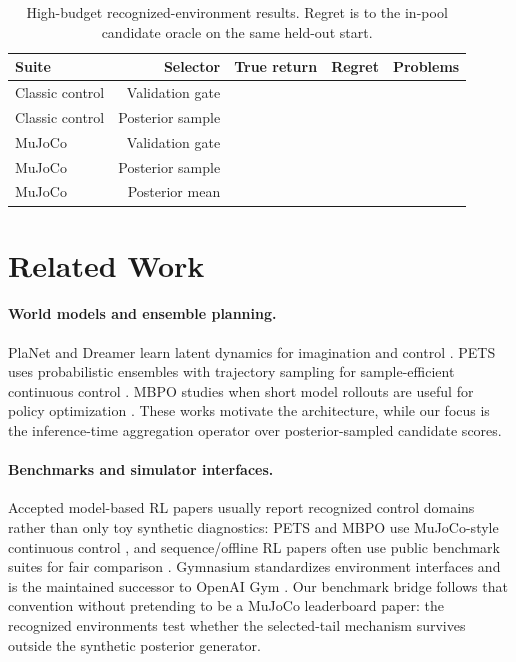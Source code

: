 \documentclass{article}
\begin{document}
\begin{table}[t]
\centering
\caption{High-budget recognized-environment results. Regret is to the in-pool
candidate oracle on the same held-out start.}
\label{tab:v4}
\begin{tabular}{lrrrr}
\toprule
Suite & Selector & True return & Regret & Problems \\
\midrule
Classic control & Validation gate & \VFourGymGateReturn{} & \VFourGymGateRegret{} & \VFourGymProblems{} \\
Classic control & Posterior sample & \VFourGymSampleReturn{} & \VFourGymSampleRegret{} & \VFourGymProblems{} \\
MuJoCo & Validation gate & \VFourMujocoGateReturn{} & \VFourMujocoGateRegret{} & \VFourMujocoProblems{} \\
MuJoCo & Posterior sample & \VFourMujocoSampleReturn{} & \VFourMujocoSampleRegret{} & \VFourMujocoProblems{} \\
MuJoCo & Posterior mean & \VFourMujocoMeanReturn{} & \VFourMujocoMeanRegret{} & \VFourMujocoProblems{} \\
\bottomrule
\end{tabular}
\end{table}

\section{Related Work}

\paragraph{World models and ensemble planning.}
PlaNet and Dreamer learn latent dynamics for imagination and control
\citep{hafner2019planet,hafner2020dreamer,hafner2023dreamerv3}. PETS uses
probabilistic ensembles with trajectory sampling for sample-efficient
continuous control \citep{chua2018pets}. MBPO studies when short model rollouts
are useful for policy optimization \citep{janner2019mbpo}. These works motivate
the architecture, while our focus is the inference-time aggregation operator
over posterior-sampled candidate scores.

\paragraph{Benchmarks and simulator interfaces.}
Accepted model-based RL papers usually report recognized control domains
rather than only toy synthetic diagnostics: PETS and MBPO use MuJoCo-style
continuous control \citep{chua2018pets,janner2019mbpo,todorov2012mujoco}, and
sequence/offline RL papers often use public benchmark suites for fair
comparison \citep{janner2021trajectory}. Gymnasium standardizes environment
interfaces and is the maintained successor to OpenAI Gym
\citep{towers2024gymnasium}. Our benchmark bridge follows that convention
without pretending to be a MuJoCo leaderboard paper: the recognized
environments test whether the selected-tail mechanism survives outside the
synthetic posterior generator.
\end{document}
